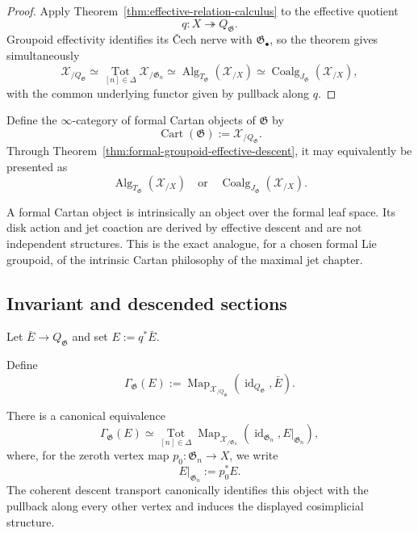 \begin{proof}
Apply Theorem~\ref{thm:effective-relation-calculus} to the effective quotient
\[
    q:X\twoheadrightarrow Q_{\mathfrak G}.
\]
Groupoid effectivity identifies its \v{C}ech nerve with
$\mathfrak G_\bullet$, so the theorem gives simultaneously
\[
    \mathcal X_{/Q_{\mathfrak G}}
    \simeq
    \operatorname*{Tot}_{[n]\in\Delta}
    \mathcal X_{/\mathfrak G_n}
    \simeq
    \operatorname{Alg}_{T_{\mathfrak G}}(\mathcal X_{/X})
    \simeq
    \operatorname{Coalg}_{J_{\mathfrak G}}(\mathcal X_{/X}),
\]
with the common underlying functor given by pullback along $q$.
\end{proof}

\begin{definition}
\label{def:formal-cartan-objects}
Define the $\infty$-category of formal Cartan objects of $\mathfrak G$ by
\[
    \operatorname{Cart}(\mathfrak G)
    :=
    \mathcal X_{/Q_{\mathfrak G}}.
\]
Through Theorem~\ref{thm:formal-groupoid-effective-descent}, it may equivalently
be presented as
\[
    \operatorname{Alg}_{T_{\mathfrak G}}(\mathcal X_{/X})
    \quad\text{or}\quad
    \operatorname{Coalg}_{J_{\mathfrak G}}(\mathcal X_{/X}).
\]
\end{definition}

\begin{remark}
A formal Cartan object is intrinsically an object over the formal leaf space.
Its disk action and jet coaction are derived by effective descent and are not
independent structures.  This is the exact analogue, for a chosen formal Lie
groupoid, of the intrinsic Cartan philosophy of the maximal jet chapter.
\end{remark}

\subsection{Invariant and descended sections}

Let $\bar E\to Q_{\mathfrak G}$ and set $E:=q^*\bar E$.

\begin{definition}
\label{def:formal-groupoid-invariant-sections}
Define
\[
    \Gamma_{\mathfrak G}(E)
    :=
    \operatorname{Map}_{\mathcal X_{/Q_{\mathfrak G}}}
    \left(
        \operatorname{id}_{Q_{\mathfrak G}},
        \bar E
    \right).
\]
\end{definition}

\begin{proposition}
\label{prop:invariant-sections-totalization}
There is a canonical equivalence
\[
    \Gamma_{\mathfrak G}(E)
    \simeq
    \operatorname*{Tot}_{[n]\in\Delta}
    \operatorname{Map}_{\mathcal X_{/\mathfrak G_n}}
    \left(
        \operatorname{id}_{\mathfrak G_n},
        E|_{\mathfrak G_n}
    \right),
\]
where, for the zeroth vertex map
$p_0:\mathfrak G_n\to X$, we write
\[
    E|_{\mathfrak G_n}:=p_0^*E.
\]
The coherent descent transport canonically identifies this object with the
pullback along every other vertex and induces the displayed cosimplicial
structure.
\end{proposition}

